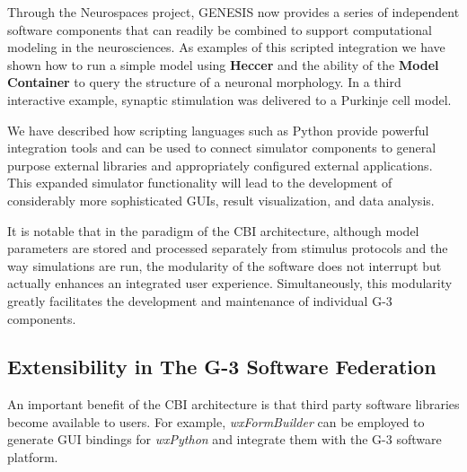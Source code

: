 \documentclass[10pt]{article}
\begin{document}
Through the Neurospaces
project, GENESIS now provides a series of independent software
components that can readily be combined to support computational
modeling in the neurosciences. As examples of this scripted integration we have shown how to run a
simple model using {\bf Heccer} and the ability of the {\bf
  Model Container} to query the structure of a neuronal morphology.
In a third interactive example, synaptic stimulation was delivered to
a Purkinje cell model.  

We have described how scripting
languages such as Python provide powerful integration tools
and can be used to connect simulator components to general purpose
external libraries and appropriately configured external applications.
This expanded simulator functionality will lead to the development of
considerably more sophisticated GUIs, result visualization, and data
analysis.

It is notable that in the paradigm of the CBI
architecture, although model parameters are stored and processed separately
from stimulus protocols and the way simulations are run, the modularity of the software does not interrupt but actually enhances an integrated user experience. Simultaneously, this
modularity greatly facilitates the development and maintenance of
individual G-3 components.

\subsection*{Extensibility in The G-3 Software Federation}

An important benefit of the CBI architecture is
that third party software libraries become available to users.  For
example, {\it wxFormBuilder} can be employed to generate GUI bindings for
{\it wxPython} and integrate them with the G-3 software platform.
\end{document}
